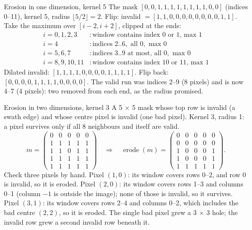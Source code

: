 \begin{worked}[label={we:masking:erode1d}]{Erosion in one dimension, kernel 5}
The mask $[0, 0, 1, 1, 1, 1, 1, 1, 1, 1, 0, 0]$ (indices 0--11), kernel 5, radius $\lfloor 5/2 \rfloor
= 2$. Flip: invalid $= [1, 1, 0, 0, 0, 0, 0, 0, 0, 0, 1, 1]$. Take the maximum over $[i - 2, i + 2]$,
clipped at the ends:
\begin{align*}
i = 0, 1, 2, 3&: \text{window contains index 0 or 1, max } 1\\
i = 4&: \text{indices } 2..6, \text{ all } 0, \text{ max } 0\\
i = 5, 6, 7&: \text{indices } 3..9 \text{ at most, all } 0, \text{ max } 0\\
i = 8, 9, 10, 11&: \text{window contains index 10 or 11, max } 1
\end{align*}
Dilated invalid: $[1,1,1,1,0,0,0,0,1,1,1,1]$. Flip back: $[0,0,0,0,1,1,1,1,0,0,0,0]$. The valid run was
indices 2--9 (8 pixels) and is now 4--7 (4 pixels): two removed from each end, as the radius promised.
\end{worked}

\begin{worked}[label={we:masking:erode2d}]{Erosion in two dimensions, kernel 3}
A 5 $\times$ 5 mask whose top row is invalid (a swath edge) and whose centre pixel is invalid (one bad
pixel). Kernel 3, radius 1: a pixel survives only if all 8 neighbours and itself are valid.
\[
m = \begin{pmatrix}0&0&0&0&0\\1&1&1&1&1\\1&1&0&1&1\\1&1&1&1&1\\1&1&1&1&1\end{pmatrix}
\quad\Longrightarrow\quad
\operatorname{erode}(m) = \begin{pmatrix}0&0&0&0&0\\0&0&0&0&0\\1&0&0&0&1\\1&0&0&0&1\\1&1&1&1&1\end{pmatrix}.
\]
Check three pixels by hand. Pixel $(1, 0)$: its window covers rows 0--2, and row 0 is invalid, so it
is eroded. Pixel $(2, 0)$: its window covers rows 1--3 and columns 0--1 (column $-1$ is outside the
image); none of those is invalid, so it survives. Pixel $(3, 1)$: its window covers rows 2--4 and
columns 0--2, which includes the bad centre $(2, 2)$, so it is eroded. The single bad pixel grew a
3 $\times$ 3 hole; the invalid row grew a second invalid row beneath it.
\end{worked}

